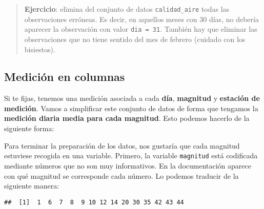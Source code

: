 \documentclass[]{article}
\newenvironment{Shaded}{\begin{snugshade}}{\end{snugshade}}
\newcommand{\DataTypeTok}[1]{\textcolor[rgb]{0.13,0.29,0.53}{#1}}
\newcommand{\KeywordTok}[1]{\textcolor[rgb]{0.13,0.29,0.53}{\textbf{#1}}}
\newcommand{\NormalTok}[1]{#1}
\newcommand{\OperatorTok}[1]{\textcolor[rgb]{0.81,0.36,0.00}{\textbf{#1}}}
\newcommand{\OtherTok}[1]{\textcolor[rgb]{0.56,0.35,0.01}{#1}}
\newcommand{\StringTok}[1]{\textcolor[rgb]{0.31,0.60,0.02}{#1}}
\begin{document}
\begin{quote}
\textbf{Ejercicio}: elimina del conjunto de datos \texttt{calidad\_aire}
todas las observaciones erróneas. Es decir, en aquellos meses con 30
días, no debería aparecer la observación con valor \texttt{dia\ =\ 31}.
También hay que eliminar las observaciones que no tiene sentido del mes
de febrero (cuidado con los bisiestos).
\end{quote}

\hypertarget{medicion-en-columnas}{%
\subsection{Medición en columnas}\label{medicion-en-columnas}}

Si te fijas, tenemos una medición asociada a cada \textbf{día},
\textbf{magnitud} y \textbf{estación de medición}. Vamos a simplificar
este conjunto de datos de forma que tengamos la \textbf{medición diaria
media para cada magnitud}. Esto podemos hacerlo de la siguiente forma:

\begin{Shaded}
\end{Shaded}

Para terminar la preparación de los datos, nos gustaría que cada
magnitud estuviese recogida en una variable. Primero, la variable
\texttt{magnitud} está codificada mediante números que no son muy
informativos. En la documentación aparece con qué magnitud se
corresponde cada número. Lo podemos traducir de la siguiente manera:

\begin{Shaded}
\end{Shaded}

\begin{verbatim}
##  [1]  1  6  7  8  9 10 12 14 20 30 35 42 43 44
\end{verbatim}
\end{document}
